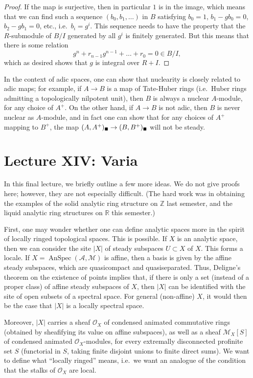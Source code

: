 \documentclass[11pt]{amsbook}
\DeclareMathOperator{\AnSpec}{AnSpec}
\newcommand{\solid}{{\mathsmaller{\blacksquare}}}
\numberwithin{equation}{section}
\numberwithin{theorem}{section}
\theoremstyle{definition}
\begin{document}
\begin{proof}
If the map is surjective, then in particular $1$ is in the image, which means that we can find such a sequence $(b_0,b_1,\ldots)$ in $B$ satisfying $b_0=1$, $b_1-gb_0=0$, $b_2-gb_1=0$, etc., i.e.~$b_i=g^i$. This sequence needs to have the property that the $R$-submodule of $B/I$ generated by all $g^i$ is finitely generated. But this means that there is some relation
\[
g^n + r_{n-1} g^{n-1} + \ldots + r_0 = 0\in B/I,
\]
which as desired shows that $g$ is integral over $R+I$.
\end{proof}


In the context of adic spaces, one can show that nuclearity is closely related to adic maps; for example, if $A\to B$ is a map of Tate-Huber rings (i.e.~Huber rings admitting a topologically nilpotent unit), then $B$ is always a nuclear $A$-module, for any choice of $A^+$. On the other hand, if $A\to B$ is not adic, then $B$ is never nuclear as $A$-module, and in fact one can show that for any choices of $A^+$ mapping to $B^+$, the map $(A,A^+)_\solid\to (B,B^+)_\solid$ will not be steady.

\newpage

\section{Lecture XIV: Varia}

In this final lecture, we briefly outline a few more ideas. We do not give proofs here; however, they are not especially difficult. (The hard work was in obtaining the examples of the solid analytic ring structure on $\mathbb Z$ last semester, and the liquid analytic ring structures on $\mathbb R$ this semester.)

First, one may wonder whether one can define analytic spaces more in the spirit of locally ringed topological spaces. This is possible. If $X$ is an analytic space, then we can consider the site $|X|$ of steady subspaces $U\subset X$ of $X$. This forms a locale. If $X=\AnSpec(\mathcal A,\mathcal M)$ is affine, then a basis is given by the affine steady subspaces, which are quasicompact and quasiseparated. Thus, Deligne's theorem on the existence of points implies that, if there is only a set (instead of a proper class) of affine steady subspaces of $X$, then $|X|$ can be identified with the site of open subsets of a spectral space. For general (non-affine) $X$, it would then be the case that $|X|$ is a locally spectral space.

Moreover, $|X|$ carries a sheaf $\mathcal O_X$ of condensed animated commutative rings (obtained by sheafifying its value on affine subspaces), as well as a sheaf $\mathcal M_X[S]$ of condensed animated $\mathcal O_X$-modules, for every extremally disconnected profinite set $S$ (functorial in $S$, taking finite disjoint unions to finite direct sums). We want to define what ``locally ringed'' means, i.e.~we want an analogue of the condition that the stalks of $\mathcal O_X$ are local.
\end{document}
